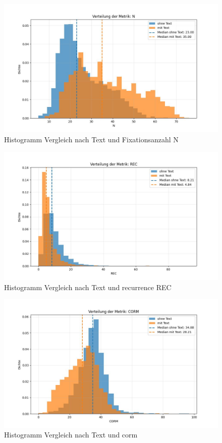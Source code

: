 \documentclass[
    language=german, %
    thesis=seminar, %
    supervisor=postdoc, %
    multiauthor=true, %
    ]{settings/csssa-thesis}
\begin{document}
\begin{figure}[h]
    \centering
    \includegraphics[width=\linewidth,height=0.8\textheight,keepaspectratio]{figures/Bild18.jpeg}
    \caption{Histogramm Vergleich nach Text und Fixationsanzahl N}\label{fig:bild15}
\end{figure}
\begin{figure}[h]
    \centering
    \includegraphics[width=\linewidth,height=0.8\textheight,keepaspectratio]{figures/Bild19.jpeg}
    \caption{Histogramm Vergleich nach Text und recurrence REC}\label{fig:bild16}
\end{figure}
\begin{figure}[h]
    \centering
    \includegraphics[width=\linewidth,height=0.8\textheight,keepaspectratio]{figures/Bild20.jpeg}
    \caption{Histogramm Vergleich nach Text und corm}\label{fig:bild17}
\end{figure}
\end{document}
